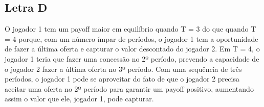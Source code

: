 \documentclass[a4paper,12pt]{article}[abntex2]
\begin{document}
\subsection{\textbf{Letra D}}
O jogador 1 tem um payoff maior em equilíbrio quando T = 3 do que quando T = 4 porque, com um número ímpar de períodos, o jogador 1 tem a oportunidade de fazer a última oferta e capturar o valor descontado do jogador 2. Em T = 4, o jogador 1 teria que fazer uma concessão no 2º período, prevendo a capacidade de o jogador 2 fazer a última oferta no 3º período. Com uma sequência de três períodos, o jogador 1 pode se aproveitar do fato de que o jogador 2 precisa aceitar uma oferta no 2º período para garantir um payoff positivo, aumentando assim o valor que ele, jogador 1, pode capturar.
\end{document}

